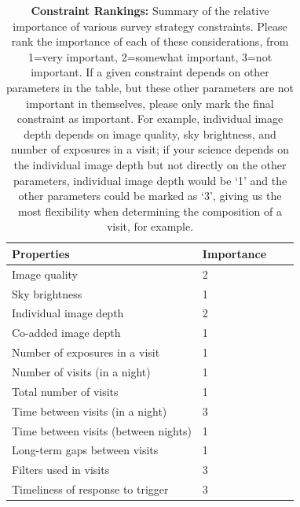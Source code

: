 \documentclass[11pt]{article}
\begin{document}
\begin{table}[ht]
    \centering
    \begin{tabular}{l|l|l|l}
        \toprule
        Properties & Importance \hspace{.3in} \\
        \midrule
        Image quality &  2   \\
        Sky brightness &  1\\
        Individual image depth & 2  \\
        Co-added image depth &  1 \\
        Number of exposures in a visit   & 1  \\
        Number of visits (in a night)  &   1\\ 
        Total number of visits &  1 \\
        Time between visits (in a night) &  3\\
        Time between visits (between nights)  &  1 \\
        Long-term gaps between visits &1 \\
        Filters used in visits & 3 \\
        Timeliness of response to trigger & 3\\
        \bottomrule
    \end{tabular}
    \caption{{\bf Constraint Rankings:} Summary of the relative importance of various survey strategy constraints. Please rank the importance of each of these considerations, from 1=very important, 2=somewhat important, 3=not important. If a given constraint depends on other parameters in the table, but these other parameters are not important in themselves, please only mark the final constraint as important. For example, individual image depth depends on image quality, sky brightness, and number of exposures in a visit; if your science depends on the individual image depth but not directly on the other parameters, individual image depth would be `1' and the other parameters could be marked as `3', giving us the most flexibility when determining the composition of a visit, for example.}
        \label{tab:obs_constraints}
\end{table}
\end{document}
